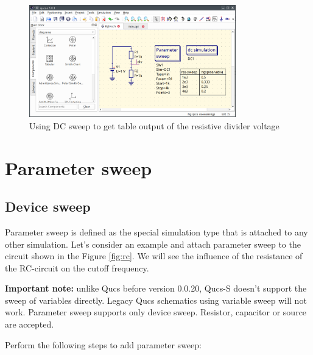 \documentclass[a4paper,12pt]{article}
\begin{document}
\begin{figure}[!ht]
    \begin{center}
        \includegraphics[width=0.8\textwidth]{img/rdiv_dc.png}
    \end{center}
    \caption{Using DC sweep to get table output of the resistive divider 
voltage} 
\label{fig:rdiv_dc}
\end{figure}

\section{Parameter sweep}

\subsection{Device sweep}

Parameter sweep is defined as the special simulation type that is attached to any other simulation. Let's consider an example
and attach parameter sweep to the circuit shown in the Figure \ref{fig:rc}. We will see the influence of the resistance of
the RC-circuit on the cutoff frequency. 

\textbf{Important note:} unlike Qucs before version 0.0.20, Qucs-S doesn't support the sweep of variables directly. Legacy Qucs schematics using variable sweep will not work. Parameter sweep supports only device sweep. Resistor, capacitor or source are accepted.  

Perform the following steps to add parameter sweep:
\end{document}
